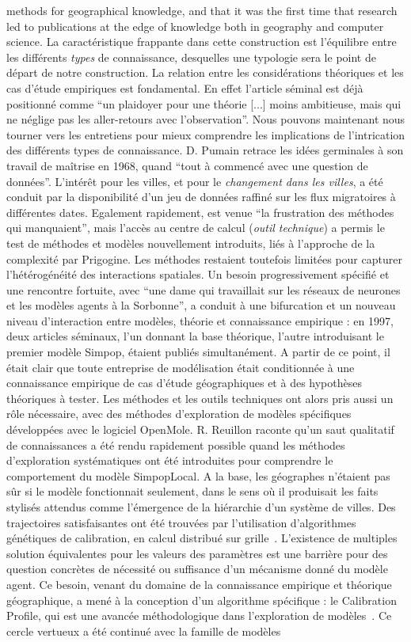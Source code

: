 {methods for geographical knowledge, and that it was the first time that research led to publications at the edge of knowledge both in geography and computer science.
}{
La caractéristique frappante dans cette construction est l'équilibre entre les différents \emph{types} de connaissance, desquelles une typologie sera le point de départ de notre construction. La relation entre les considérations théoriques et les cas d'étude empiriques est fondamental. En effet l'article séminal \cite{pumain1997pour} est déjà positionné comme ``un plaidoyer pour une théorie [...] moins ambitieuse, mais qui ne néglige pas les aller-retours avec l'observation''. Nous pouvons maintenant nous tourner vers les entretiens pour mieux comprendre les implications de l'intrication des différents types de connaissance. D. Pumain retrace les idées germinales à son travail de maîtrise en 1968, quand ``tout à commencé avec une question de données''. L'intérêt pour les villes, et pour le \emph{changement dans les villes}, a été conduit par la disponibilité d'un jeu de données raffiné sur les flux migratoires à différentes dates. Egalement rapidement, est venue ``la frustration des méthodes qui manquaient'', mais l'accès au centre de calcul (\emph{outil technique}) a permis le test de méthodes et modèles nouvellement introduits, liés à l'approche de la complexité par Prigogine. Les méthodes restaient toutefois limitées pour capturer l'hétérogénéité des interactions spatiales. Un besoin progressivement spécifié et une rencontre fortuite, avec ``une dame qui travaillait sur les réseaux de neurones et les modèles agents à la Sorbonne'', a conduit à une bifurcation et un nouveau niveau d'interaction entre modèles, théorie et connaissance empirique : en 1997, deux articles séminaux, l'un donnant la base théorique, l'autre introduisant le premier modèle Simpop, étaient publiés simultanément. A partir de ce point, il était clair que toute entreprise de modélisation était conditionnée à une connaissance empirique de cas d'étude géographiques et à des hypothèses théoriques à tester. Les méthodes et les outils techniques ont alors pris aussi un rôle nécessaire, avec des méthodes d'exploration de modèles spécifiques développées avec le logiciel OpenMole. R. Reuillon raconte qu'un saut qualitatif de connaissances a été rendu rapidement possible quand les méthodes d'exploration systématiques ont été introduites pour comprendre le comportement du modèle SimpopLocal. A la base, les géographes n'étaient pas sûr si le modèle fonctionnait seulement, dans le sens où il produisait les faits stylisés attendus comme l'émergence de la hiérarchie d'un système de villes. Des trajectoires satisfaisantes ont été trouvées par l'utilisation d'algorithmes génétiques de calibration, en calcul distribué sur grille~\cite{schmitt2014half}. L'existence de multiples solution équivalentes pour les valeurs des paramètres est une barrière pour des question concrètes de nécessité ou suffisance d'un mécanisme donné du modèle agent. Ce besoin, venant du domaine de la connaissance empirique et théorique géographique, a mené à la conception d'un algorithme spécifique : le Calibration Profile, qui est une avancée méthodologique dans l'exploration de modèles~\cite{reuillon2015}. Ce cercle vertueux a été continué avec la famille de modèles }
